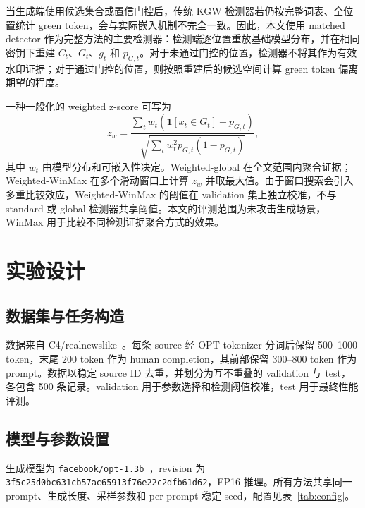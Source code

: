 \documentclass[a4paper,UTF8,zihao=5]{ctexart}
\begin{document}
当生成端使用候选集合或置信门控后，传统 KGW 检测器若仍按完整词表、全位置统计 green token，会与实际嵌入机制不完全一致。因此，本文使用 matched detector 作为完整方法的主要检测器：检测端逐位置重放基础模型分布，并在相同密钥下重建 $C_t$、$G_t$、$g_t$ 和 $p_{G,t}$。对于未通过门控的位置，检测器不将其作为有效水印证据；对于通过门控的位置，则按照重建后的候选空间计算 green token 偏离期望的程度。

一种一般化的 weighted z-score 可写为
\[
    z_w=\frac{\sum_t w_t(\mathbf 1[x_t\in G_t]-p_{G,t})}
    {\sqrt{\sum_t w_t^2p_{G,t}(1-p_{G,t})}},
\]
其中 $w_t$ 由模型分布和可嵌入性决定。Weighted-global 在全文范围内聚合证据；Weighted-WinMax 在多个滑动窗口上计算 $z_w$ 并取最大值。由于窗口搜索会引入多重比较效应，Weighted-WinMax 的阈值在 validation 集上独立校准，不与 standard 或 global 检测器共享阈值。本文的评测范围为未攻击生成场景，WinMax 用于比较不同检测证据聚合方式的效果。

\section{实验设计}

\subsection{数据集与任务构造}

数据来自 C4/realnewslike~\cite{raffel2020exploring}。每条 source 经 OPT tokenizer 分词后保留 500--1000 token，末尾 200 token 作为 human completion，其前部保留 300--800 token 作为 prompt。数据以稳定 source ID 去重，并划分为互不重叠的 validation 与 test，各包含 500 条记录。validation 用于参数选择和检测阈值校准，test 用于最终性能评测。

\subsection{模型与参数设置}

生成模型为 \texttt{facebook/opt-1.3b}~\cite{zhang2022opt}，revision 为 \texttt{3f5c25d0bc631cb57ac65913f76e22c2dfb61d62}，FP16 推理。所有方法共享同一 prompt、生成长度、采样参数和 per-prompt 稳定 seed，配置见表~\ref{tab:config}。
\end{document}
